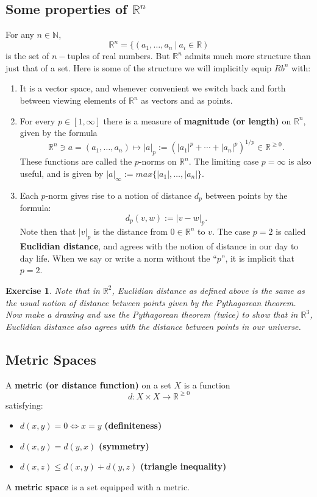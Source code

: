 \documentclass[12pt]{amsart}
\newtheorem{exercise}[theorem]{Exercise}
\numberwithin{equation}{section}
\newcommand\Rb{{\mathbb R}} %
\newcommand\Nb{{\mathbb N}} %
\newcommand{\To}{\longrightarrow}
\newcommand{\mTo}{\longmapsto}
\newcommand{\pipe}{\:|\:}
\begin{document}
\subsection{Some properties of $\Rb^n$} For any $n\in\Nb$, $$\Rb^n = \{(a_1,\dots,a_n\pipe a_i\in\Rb)$$ is the set of $n-$tuples of real numbers.  But $\Rb^n$ admits much more structure than just that of a set.  Here is some of the structure we will implicitly equip $Rb^n$ with:
\begin{enumerate}
\item It is a vector space, and whenever convenient we switch back and forth between viewing elements of $\Rb^n$ as vectors and as points.
\item For every $p\in [1,\infty]$ there is a measure of \textbf{magnitude (or length)} on $\Rb^n$, given by the formula
$$ \Rb^n\ni a=(a_1,\dots,a_n)\mTo |a|_p:=(|a_1|^p+\cdots+|a_n|^p)^{1/p}\in \Rb^{\geq 0}.$$
These functions are called the $p$-norms on $\Rb^n$.  The limiting case $p=\infty$ is also useful, and is given by $|a|_\infty:=max\{|a_1|,\dots,|a_n|\}$.
\item Each $p$-norm gives rise to a notion of distance $d_p$ between points by the formula:
$$d_p(v,w):=|v-w|_p.$$
Note then that $|v|_p$ is the distance from $0\in\Rb^n$ to $v$.
The case $p=2$ is called \textbf{Euclidian distance}, and agrees with the notion of distance in our day to day life. When we say or write a norm without the ``$p$'', it is implicit that $p=2$.
\end{enumerate}

\begin{exercise} Note that in $\Rb^2$, Euclidian distance as defined above is the same as the usual notion of distance between points given by the Pythagorean theorem.  Now make a drawing and use the Pythagorean theorem (twice) to show that in $\Rb^3$, Euclidian distance also agrees with the distance between points in our universe.
\end{exercise}

\subsection{Metric Spaces} A \textbf{metric (or distance function)} on a set $X$ is a function
$$d:X\times X\To \Rb^{\geq0}$$ satisfying:
 \begin{itemize}
  \item $d(x,y)=0\iff x=y$ \textbf{(definiteness)}
  \item $d(x,y) = d(y,x)$ \textbf{(symmetry)}
  \item $d(x,z)\leq d(x,y)+d(y,z)$ \textbf{(triangle inequality)}
 \end{itemize}
A \textbf{metric space} is a set equipped with a metric.
\end{document}
